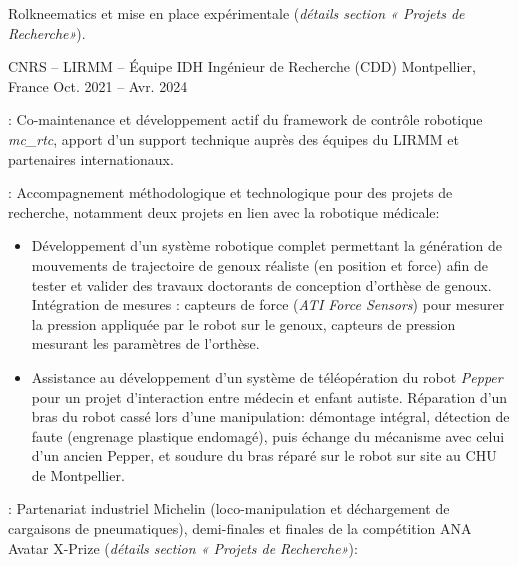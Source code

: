 \begin{cventries}
{\begin{cvitems}
      Rolkneematics et mise en place expérimentale (\emph{détails section « Projets de Recherche»}).
    \end{cvitems}
  }
  \cventry
  {CNRS -- LIRMM -- Équipe IDH} %
  {Ingénieur de Recherche (CDD)} %
  {Montpellier, France} %
  {Oct. 2021 -- Avr. 2024} %
  {
    \begin{cvitems} %
    \item {} : Co-maintenance et développement actif du
      framework de contrôle robotique \emph{mc\_rtc}, apport d'un support technique auprès des équipes du
      LIRMM et partenaires internationaux.
    \item {} : Accompagnement méthodologique et technologique pour des
      projets de recherche, notamment deux projets en lien avec la robotique médicale:
      \begin{itemize}
        \item Développement d'un système robotique complet permettant la génération de mouvements de
          trajectoire de genoux réaliste (en position et force) afin de tester et valider des travaux
          doctorants de conception d'orthèse de genoux. Intégration de mesures : capteurs de force (\emph{ATI
          Force Sensors}) pour mesurer la pression appliquée par le robot sur le genoux, capteurs de pression
          mesurant les paramètres de l'orthèse.
        \item Assistance au développement d'un système de téléopération du robot \emph{Pepper} pour un projet
          d'interaction entre médecin et enfant autiste. Réparation d'un bras du robot cassé lors d'une
          manipulation: démontage intégral, détection de faute (engrenage plastique endomagé), puis échange
          du mécanisme avec celui d'un ancien Pepper, et soudure du bras réparé sur le robot sur site au CHU
          de Montpellier.
      \end{itemize}
    \item {} : Partenariat industriel Michelin (loco-manipulation
      et déchargement de cargaisons de pneumatiques), demi-finales et finales de la compétition ANA Avatar
      X-Prize (\emph{détails section « Projets de Recherche»}):
    \end{cvitems}
  }


\end{cventries}
